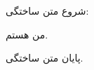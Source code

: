 شروع متن ساختگی:

من \fullName هستم.

\descriptions

\workExperienceList

\acronymlist

پایان متن ساختگی.